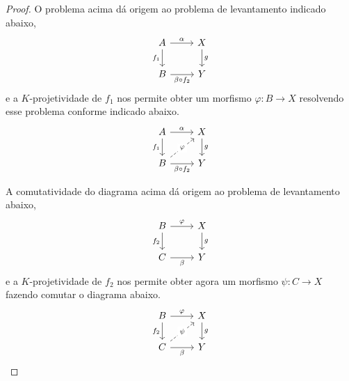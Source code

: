 \begin{proof}
  O problema acima dá origem ao problema de levantamento indicado abaixo,
  \begin{equation*}
    \begin{tikzcd}
      A
      \arrow[r, "\alpha"]
      \arrow[d, "f_1" swap]
      & X
      \arrow[d, "g"]
      \\ B
      \arrow[r, "\beta \circ f_2" swap]
      & Y
    \end{tikzcd}
  \end{equation*}
  e a $K$-projetividade de $f_1$ nos permite obter um morfismo $\varphi: B \to X$ resolvendo esse problema conforme indicado abaixo.
  \begin{equation}\label{eq:comp_K-proj_diag_3}
    \begin{tikzcd}
      A
      \arrow[r, "\alpha"]
      \arrow[d, "f_1" swap]
      & X
      \arrow[d, "g"]
      \\ B
      \arrow[r, "\beta \circ f_2" swap]
      \arrow[ru, dashed, "\varphi" description]
      & Y
    \end{tikzcd}
  \end{equation}

  A comutatividade do diagrama acima dá origem ao problema de levantamento abaixo,
  \begin{equation*}
    \begin{tikzcd}
      B
      \arrow[r, "\varphi"]
      \arrow[d, "f_2" swap]
      &   X
      \arrow[d, "g"]
      \\ C
      \arrow[r, "\beta" swap]
      & Y
    \end{tikzcd}
  \end{equation*}
  e a $K$-projetividade de $f_2$ nos permite obter agora um morfismo $\psi: C \to X$ fazendo comutar o diagrama abaixo.
  \begin{equation}\label{eq:comp_K-proj_diag_5}
    \begin{tikzcd}
      B
      \arrow[r, "\varphi"]
      \arrow[d, "f_2" swap]
      &   X
      \arrow[d, "g"]
      \\ C
      \arrow[r, "\beta" swap]
      \arrow[ru, dashed, "\psi" description]
      & Y
    \end{tikzcd}
  \end{equation}


\end{proof}
